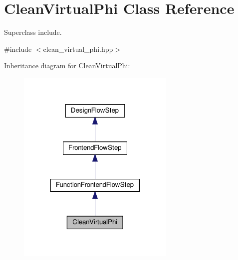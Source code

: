\hypertarget{classCleanVirtualPhi}{}\section{Clean\+Virtual\+Phi Class Reference}
\label{classCleanVirtualPhi}


Superclass include.  




{\ttfamily \#include $<$clean\+\_\+virtual\+\_\+phi.\+hpp$>$}



Inheritance diagram for Clean\+Virtual\+Phi\+:
\nopagebreak
\begin{figure}[H]
\begin{center}
\leavevmode
\includegraphics[width=214pt]{d9/d3d/classCleanVirtualPhi__inherit__graph}
\end{center}
\end{figure}


